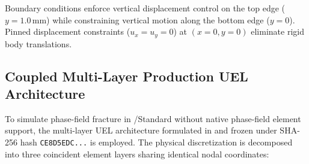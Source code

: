 Boundary conditions enforce vertical displacement control on the top edge ($y = 1.0\,\mathrm{mm}$) while constraining vertical motion along the bottom edge ($y = 0$). Pinned displacement constraints ($u_x = u_y = 0$) at $(x=0, y=0)$ eliminate rigid body translations.

\subsection{Coupled Multi-Layer Production UEL Architecture}
\label{subsec:hole_uel_architecture}

To simulate phase-field fracture in \Abaqus/Standard without native phase-field element support, the multi-layer UEL architecture formulated in \citet{molnar2017} and frozen under SHA-256 hash \texttt{CE8D5EDC...} is employed. The physical discretization is decomposed into three coincident element layers sharing identical nodal coordinates:
